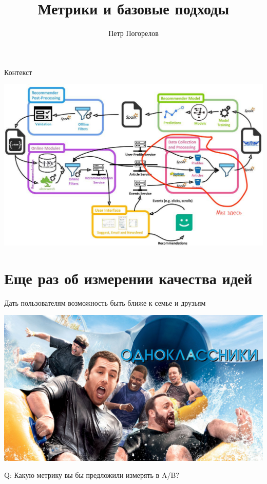 \documentclass[11pt,aspectratio=169,handout]{beamer}
\author{Петр Погорелов}
\title{Метрики и базовые подходы}
\begin{document}
{

\begin{frame}
\titlepage
\end{frame}

}

\begin{frame}{Контекст}

\begin{center}
\includegraphics[scale=0.23]{images/mendeley.jpeg}
\end{center}

\end{frame}

\section{Еще раз об измерении качества идей}

\begin{frame}{}

\begin{tcolorbox}[colback=gray!5,colframe=gray!80,title=Миссия компании]
Дать пользователям возможность быть ближе к семье и друзьям
\end{tcolorbox}

\vfill

\begin{center}
\includegraphics[scale=0.1]{images/odnoklassniki.jpeg}
\end{center}

\vfill

Q: Какую метрику вы бы предложили измерять в A/B?

\end{frame}
\end{document}

